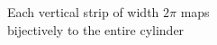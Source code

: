 \documentclass[preview]{standalone}
\begin{document}
\begin{center}
Each vertical strip of width $2\pi$ maps\\bijectively to the entire cylinder
\end{center}
\end{document}
